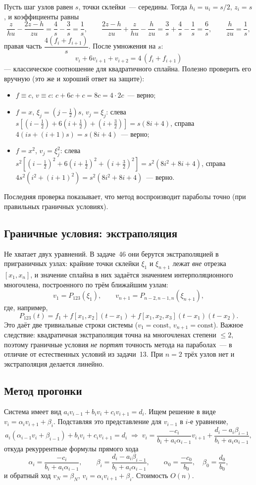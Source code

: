 \documentclass[11pt,a4paper]{report}
\begin{document}
Пусть шаг узлов равен $s$, точки склейки~--- середины. Тогда
$h_i=u_i=s/2$, $z_i=s$, и коэффициенты равны
\[
\frac{z}{hu}-\frac{2z-h}{zu}=\frac{4}{s}-\frac{3}{s}=\frac1s,\qquad
\frac{2z-h}{zu}+\frac{z}{hu}-\frac{h}{zu}=\frac3s+\frac4s-\frac1s=\frac6s,\qquad
\frac{h}{zu}=\frac1s,
\]
правая часть $\dfrac{4(f_i+f_{i+1})}{s}$. После умножения на $s$:
\[
\boxed{\,v_i+6v_{i+1}+v_{i+2}=4\,(f_i+f_{i+1})\,}
\]
--- классическое соотношение для квадратичного сплайна. Полезно проверить его
вручную (это же и хороший ответ на защите):
\begin{itemize}[nosep]
\item $f\equiv c$, $v\equiv c$: $c+6c+c=8c=4\cdot 2c$~--- верно;
\item $f=x$, $\xi_j=(j-\tfrac12)s$, $v_j=\xi_j$: слева
$s[(i-\tfrac12)+6(i+\tfrac12)+(i+\tfrac32)]=s(8i+4)$, справа
$4(is+(i+1)s)=s(8i+4)$~--- верно;
\item $f=x^2$, $v_j=\xi_j^2$: слева
$s^2[(i-\tfrac12)^2+6(i+\tfrac12)^2+(i+\tfrac32)^2]=s^2(8i^2+8i+4)$,
справа $4s^2(i^2+(i+1)^2)=s^2(8i^2+8i+4)$~--- верно.
\end{itemize}
Последняя проверка показывает, что метод воспроизводит параболы точно
(при правильных граничных условиях).

\subsection{Граничные условия: экстраполяция}

Не хватает двух уравнений. В задаче~46 они берутся экстраполяцией в
приграничных узлах: крайние точки склейки $\xi_1$ и $\xi_{n+1}$ лежат
\emph{вне} отрезка $[x_1,x_n]$, и значение сплайна в них задаётся значением
интерполяционного многочлена, построенного по трём ближайшим узлам:
\[
v_1=P_{123}(\xi_1),\qquad v_{n+1}=P_{n-2,n-1,n}(\xi_{n+1}),
\]
где, например,
\[
P_{123}(t)=f_1+f[x_1,x_2](t-x_1)+f[x_1,x_2,x_3](t-x_1)(t-x_2).
\]
Это даёт две тривиальные строки системы ($v_1=\text{const}$,
$v_{n+1}=\text{const}$). Важное следствие: квадратичная экстраполяция точна на
многочленах степени $\le2$, поэтому граничные условия \emph{не портят}
точность метода на параболах~--- в отличие от естественных условий из
задачи~13. При $n=2$ трёх узлов нет и экстраполяция делается линейно.

\subsection{Метод прогонки}

Система имеет вид $a_iv_{i-1}+b_iv_i+c_iv_{i+1}=d_i$. Ищем решение в виде
$v_i=\alpha_iv_{i+1}+\beta_i$. Подставляя это представление для $v_{i-1}$ в
$i$-е уравнение,
\[
a_i(\alpha_{i-1}v_i+\beta_{i-1})+b_iv_i+c_iv_{i+1}=d_i
\;\Longrightarrow\;
v_i=\frac{-c_i}{b_i+a_i\alpha_{i-1}}v_{i+1}
+\frac{d_i-a_i\beta_{i-1}}{b_i+a_i\alpha_{i-1}},
\]
откуда рекуррентные формулы прямого хода
\[
\alpha_i=\frac{-c_i}{b_i+a_i\alpha_{i-1}},\qquad
\beta_i=\frac{d_i-a_i\beta_{i-1}}{b_i+a_i\alpha_{i-1}},\qquad
\alpha_0=\frac{-c_0}{b_0},\quad\beta_0=\frac{d_0}{b_0},
\]
и обратный ход $v_N=\beta_N$, $v_i=\alpha_iv_{i+1}+\beta_i$. Стоимость $O(n)$.
\end{document}
